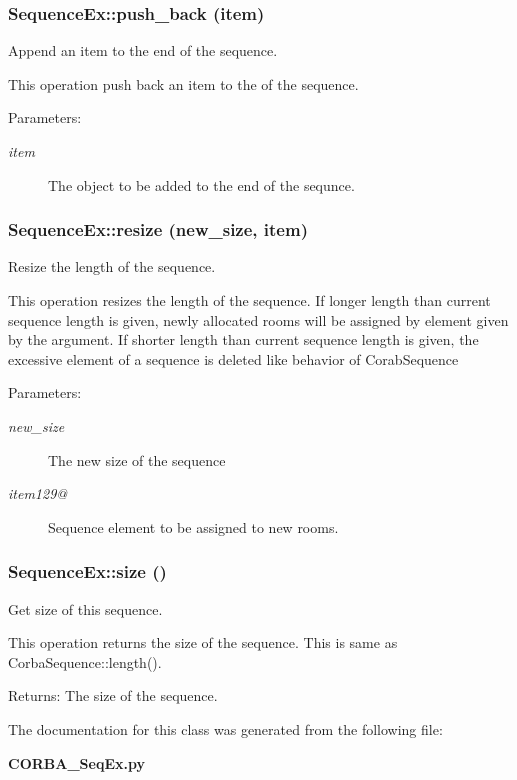\subsubsection{\setlength{\rightskip}{0pt plus 5cm}Sequence\-Ex::push\_\-back (item)}\label{classSequenceEx_SequenceExa9}


Append an item to the end of the sequence. 

This operation push back an item to the of the sequence. \begin{Desc}
\item[Parameters:]
\begin{description}
\item[{\em item}]The object to be added to the end of the sequnce.\end{description}
\end{Desc}
\subsubsection{\setlength{\rightskip}{0pt plus 5cm}Sequence\-Ex::resize (new\_\-size, item)}\label{classSequenceEx_SequenceExa5}


Resize the length of the sequence. 

This operation resizes the length of the sequence. If longer length than current sequence length is given, newly allocated rooms will be assigned by element given by the argument. If shorter length than current sequence length is given, the excessive element of a sequence is deleted like behavior of Corab\-Sequence \begin{Desc}
\item[Parameters:]
\begin{description}
\item[{\em new\_\-size}]The new size of the sequence \item[{\em item129@}]Sequence element to be assigned to new rooms.\end{description}
\end{Desc}
\subsubsection{\setlength{\rightskip}{0pt plus 5cm}Sequence\-Ex::size ()}\label{classSequenceEx_SequenceExa2}


Get size of this sequence. 

This operation returns the size of the sequence. This is same as Corba\-Sequence::length(). \begin{Desc}
\item[Returns:]The size of the sequence.\end{Desc}


The documentation for this class was generated from the following file:\begin{CompactItemize}
\item 
{\bf CORBA\_\-Seq\-Ex.py}\end{CompactItemize}
